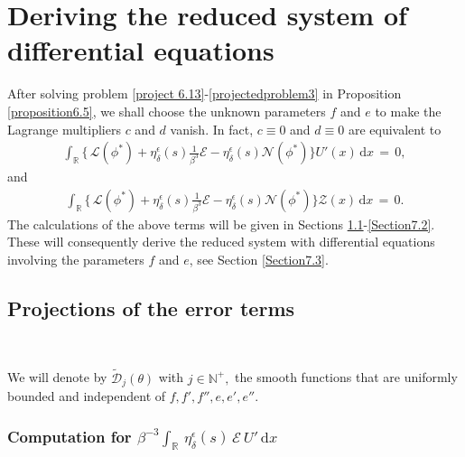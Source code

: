 \documentclass[10pt, reqno]{amsart}
\numberwithin{equation}{section}
\theoremstyle{definition}
\begin{document}
{%


\medskip
\section{Deriving the reduced system of differential equations}\label{Section7}


After solving problem \eqref{project 6.13}-\eqref{projectedproblem3} in Proposition \ref{proposition6.5},
we shall choose the unknown parameters $f$ and $e$ to make the Lagrange multipliers $c$ and $d$ vanish.
In fact, $c\equiv 0$ and $d\equiv 0$ are equivalent to
\begin{align} \label{project 6.13-1}
\int_{\mathbb R}\Big\{\,\mathcal L (\phi^*) +\eta_\delta^\epsilon(s)\frac{1}{\beta^3}{\mathcal E} - \eta_\delta^\epsilon(s){\mathcal N}(\phi^*)\Big\}
U'(x) \,{\mathrm d}x\,=\, 0,
\end{align}
and
\begin{align} \label{project 6.13-2}
\int_{\mathbb R}\Big\{\,\mathcal L (\phi^*) +\eta_\delta^\epsilon(s)\frac{1}{\beta^3}{\mathcal E} - \eta_\delta^\epsilon(s){\mathcal N}(\phi^*)\Big\}
{\mathcal Z}(x) \,{\mathrm d}x\,=\, 0.
\end{align}
The calculations of the above terms will be given in Sections \ref{Section7.1}-\ref{Section7.2}.
These will consequently derive the reduced system with differential equations involving the
parameters $f$ and $e$, see Section \ref{Section7.3}.

\subsection{ Projections of the error terms}\label{Section7.1}\


We will denote by $\tilde{\mathcal D}_j(\theta)$ with $ j\in \mathbb{N}^+, $ the smooth functions that are uniformly bounded and independent of $f, f', f'', e, e', e''$.


\subsubsection{Computation for $\beta^{-3}\int_{{\mathbb R}}\, \eta_\delta^\epsilon(s)\, {\mathcal E}\, U' \,{\mathrm d}x$}\

}
\end{document}
